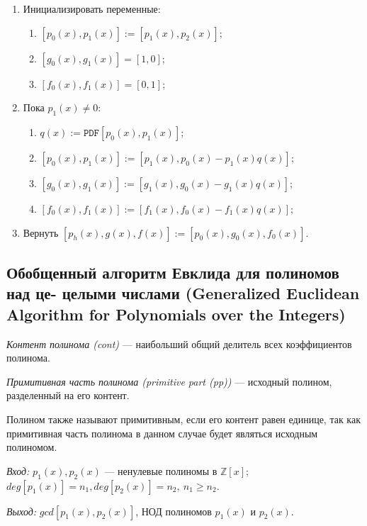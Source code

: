 \documentclass[bachelor, och, labwork]{shiza}
\begin{document}
\begin{enumerate}
    \item Инициализировать переменные: 
    \begin{enumerate}
        \item $[p_0(x), p_1(x)] := [p_1(x), p_2(x)]$;
        \item $[g_0(x), g_1(x)] = [1, 0]$;
        \item $[f_0(x), f_1(x)] = [0, 1]$;
    \end{enumerate}
    \item Пока $p_1(x) \not= 0$:
    \begin{enumerate}
        \item $q(x) := \mathtt{PDF}[p_0(x), p_1(x)]$;
        \item $[p_0(x), p_1(x)] := [p_1(x), p_0(x) - p_1(x)q(x)]$;
        \item $[g_0(x), g_1(x)] := [g_1(x), g_0(x) - g_1(x)q(x)]$;
        \item $[f_0(x), f_1(x)] := [f_1(x), f_0(x) - f_1(x)q(x)]$;
    \end{enumerate}
    \item Вернуть $[p_h(x), g(x), f(x)] := [p_0(x), g_0(x), f_0(x)]$.
\end{enumerate}


\subsection{Обобщенный алгоритм Евклида для полиномов над це-
целыми числами (Generalized Euclidean Algorithm for Polynomials over
the Integers)}

\textit{Контент полинома (cont)} --- наибольший общий делитель всех коэффициентов
полинома.

\textit{Примитивная часть полинома (primitive part (pp))} --- исходный полином,
разделенный на его контент.

Полином также называют примитивным, если его контент равен единице, так как
примитивная часть полинома в данном случае будет являться исходным полиномом.

\textit{Вход:} $p_1(x), p_2(x)$ --- ненулевые полиномы в $\mathbb{Z}[x];$
$deg[p_1(x)] = n_1, deg[p_2(x)] = n_2, ~ n_1 \geqslant n_2.$

\textit{Выход:} $gcd[p_1(x), p_2(x)]$, НОД полиномов $p_1(x)$ и $p_2(x)$.
\end{document}
